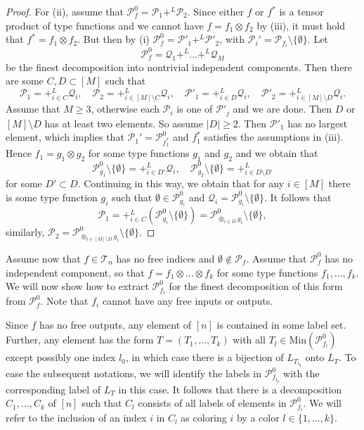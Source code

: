 \documentclass[12pt]{article}
\theoremstyle{definition}
\theoremstyle{remark}
\def\Te{\mathcal T}
\def\Pe{\mathcal P}
\begin{document}
\begin{proof}
For (ii), assume that $\Pe_f^0=\Pe_1+^L\Pe_2$. Since either $f$ or $f^*$ is a tensor
product of type functions and we cannot have $f=f_1\otimes f_2$ by (iii), 
 it must hold that $f^*=f_1\otimes f_2$. But then by (i) $\Pe_f^0=\Pe'_1+^L\Pe'_2$, with 
$\Pe_i'=\Pe_{f_i}\setminus \{\emptyset\}$. Let 
\[
\Pe_f^0=\mathcal Q_1+^L\dots +^L \mathcal Q_M
\]
be the finest decomposition into nontrivial independent components. Then there are some $C,D\subset [M]$
such that 
\[
\Pe_1=+^L_{i\in C} \mathcal Q_i,\quad  \Pe_2=+^L_{i\in [M]\setminus C} \mathcal
Q_i, \quad \Pe'_1=+^L_{i\in D} \mathcal Q_i,\quad  \Pe'_2=+^L_{i\in [M]\setminus D}
\mathcal Q_i.
\]
Assume that $M\ge 3$, otherwise each $\Pe_i$ is one of $\Pe'_j$ and we are done. 
Then $D$ or $[M]\setminus D$ has at least two elements. So assume $|D|\ge 2$. Then $\Pe'_1$ has no largest
 element, which implies that $\Pe_1'=\Pe_{f_1^*}^0$ and $f_1^*$ satisfies the assumptions
 in (iii). Hence $f_1=g_1\otimes g_2$ for some type functions $g_1$ and $g_2$ and we
 obtain that 
 \[
\Pe_{g_1}^0\setminus \{\emptyset\} = +_{i\in D'}^L \mathcal Q_i,\quad \Pe_{g_2}^0\setminus
\{\emptyset\} = +_{i\in D\setminus D'}^L
 \]
for some $D'\subset D$. Continuing in this way, we obtain that for any $i\in [M]$ there is
some type function $g_i$ such that $\emptyset \in \Pe_{g_i}^0$ and $\mathcal
Q_i=\Pe_{g_i}^0\setminus \{\emptyset\}$. It follows that 
\[
\Pe_1=+^L_{i\in C}(\Pe_{g_i}^0\setminus \{\emptyset\})=\Pe^0_{\otimes_{i\in
D}g_i}\setminus\{\emptyset\},
\]
similarly, $\Pe_2=\Pe^0_{\otimes_{i\in
[M]\setminus D}g_i}\setminus\{\emptyset\}$.


\end{proof}


Assume now that $f\in \Te_n$ has no free indices and $\emptyset\notin \Pe_f$. Assume that
$\Pe_f^0$ has no independent component, so that $f=f_1\otimes \dots \otimes f_k$ for some
type functions $f_1,\dots,f_k$. We will now show how to extract $\Pe_{f_i}^0$ for the finest decomposition
of this form from $\Pe_f^0$. Note that $f_i$ cannot have any free inputs or outputs.

Since $f$ has no free outputs, any element of $[n]$ is contained in some label set. 
Further, any element has the form $T=(T_1,\dots,T_k)$ with all $T_l\in
\mathrm{Min}(\Pe_{f_l}^0)$ except possibly one index $l_0$, in which case there is a
bijection of $L_{T_{l_0}}$ onto $L_T$. To ease the subsequent notations, we will identify
the labels in $\Pe_{f_{l_0}}^0$ with the corresponding label of $L_T$ in this case. 
It follows that there is a decomposition $C_1,\dots, C_k$ of $[n]$ such that $C_l$ consists of all
labels of elements in $\Pe_{f_i}^0$. We will refer to the inclusion of an index $i$ in $C_l$ as
coloring $i$ by a color $l\in\{1,\dots,k\}$. 
\end{document}
